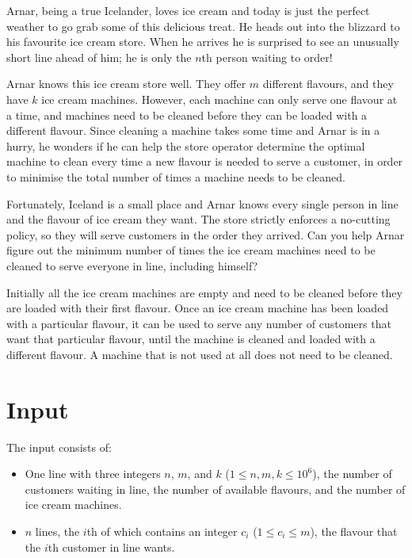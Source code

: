 Arnar, being a true Icelander, loves ice cream and today is just the perfect
weather to go grab some of this delicious treat. He heads out into the blizzard
to his favourite ice cream store. When he arrives he is surprised to see an
unusually short line ahead of him; he is only the $n$th person waiting to order!

Arnar knows this ice cream store well. They offer $m$ different flavours, and
they have $k$ ice cream machines. However, each machine can only serve one
flavour at a time, and machines need to be cleaned before they can be loaded
with a different flavour. Since cleaning a machine takes some time and Arnar is
in a hurry, he wonders if he can help the store operator determine the optimal
machine to clean every time a new flavour is needed to serve a customer, in
order to minimise the total number of times a machine needs to be cleaned.

Fortunately, Iceland is a small place and Arnar knows every single person in
line and the flavour of ice cream they want. The store strictly enforces a
no-cutting policy, so they will serve customers in the order they arrived. Can
you help Arnar figure out the minimum number of times the ice cream machines
need to be cleaned to serve everyone in line, including himself?

Initially all the ice cream machines are empty and need to be cleaned before
they are loaded with their first flavour. Once an ice cream machine has been
loaded with a particular flavour, it can be used to serve any number of
customers that want that particular flavour, until the machine is cleaned and
loaded with a different flavour. A machine that is not used at all does not
need to be cleaned.

\section*{Input}
The input consists of:
\begin{itemize}
  \item One line with three integers $n$, $m$, and $k$ ($1 \leq n, m, k \leq
        10^6$), the number of customers waiting in line, the number of available
        flavours, and the number of ice cream machines.
  \item $n$ lines, the $i$th of which contains an integer $c_i$ ($1 \leq c_i
      \leq m$), the flavour that the $i$th customer in line wants.
\end{itemize}

